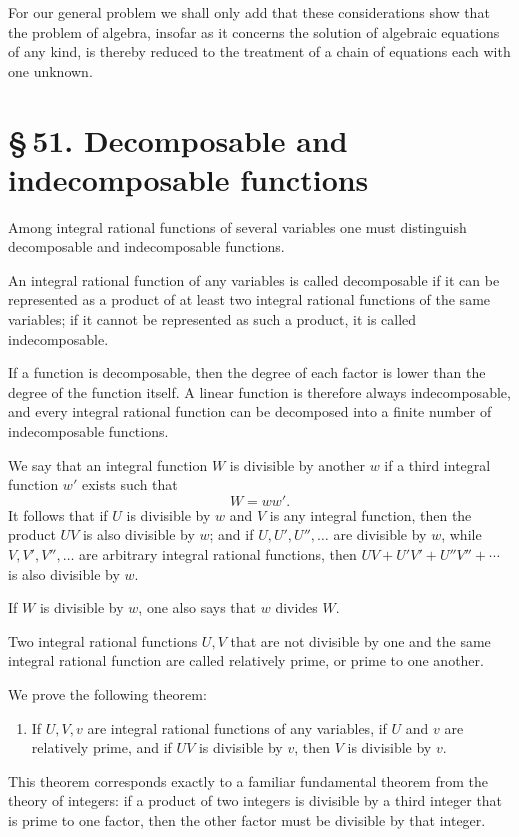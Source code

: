 \documentclass[11pt]{article}
\providecommand{\sect}[2]{\section*{\S\,#1. #2}}
\begin{document}
For our general problem we shall only add that these considerations show that the problem of algebra, insofar as it concerns the solution of algebraic equations of any kind, is thereby reduced to the treatment of a chain of equations each with one unknown.

\sect{51}{Decomposable and indecomposable functions}

Among integral rational functions of several variables one must distinguish decomposable and indecomposable functions.

An integral rational function of any variables is called decomposable if it can be represented as a product of at least two integral rational functions of the same variables; if it cannot be represented as such a product, it is called indecomposable.

If a function is decomposable, then the degree of each factor is lower than the degree of the function itself. A linear function is therefore always indecomposable, and every integral rational function can be decomposed into a finite number of indecomposable functions.

We say that an integral function $W$ is divisible by another $w$ if a third integral function $w'$ exists such that
\[
W=ww'.
\]
It follows that if $U$ is divisible by $w$ and $V$ is any integral function, then the product $UV$ is also divisible by $w$; and if $U,U',U'',\ldots$ are divisible by $w$, while $V,V',V'',\ldots$ are arbitrary integral rational functions, then $UV+U'V'+U''V''+\cdots$ is also divisible by $w$.

If $W$ is divisible by $w$, one also says that $w$ divides $W$.

Two integral rational functions $U,V$ that are not divisible by one and the same integral rational function are called relatively prime, or prime to one another.

We prove the following theorem:

\begin{enumerate}[label=\Roman*.,leftmargin=2.4em]
\item If $U,V,v$ are integral rational functions of any variables, if $U$ and $v$ are relatively prime, and if $UV$ is divisible by $v$, then $V$ is divisible by $v$.
\end{enumerate}

This theorem corresponds exactly to a familiar fundamental theorem from the theory of integers: if a product of two integers is divisible by a third integer that is prime to one factor, then the other factor must be divisible by that integer.
\end{document}
